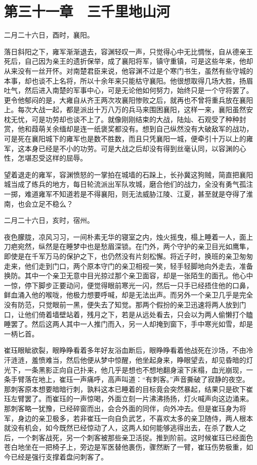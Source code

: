 \chapter{第三十一章　三千里地山河}

二月二十六日，酉时，襄阳。

落日斜阳之下，雍军渐渐退去，容渊轻叹一声，只觉得心中无比惆怅，自从德亲王死后，自己因为亲王的遗折保举，成了襄阳将军，镇守重镇，可是这些年来，他却从来没有一丝开怀。对南楚君臣来说，他容渊不过是个寒门书生，虽然有些守城的本事，却也谈不上名将，所以十余年来只能枯守襄阳。他很想取得几场大胜，扬眉吐气，然后进入南楚的军事中心，可是无论他如何努力，始终只是一个守将罢了。更令他郁闷的是，大雍自从齐王两次攻襄阳惨败之后，就再也不曾将重兵放在襄阳上。每次大战一起，都是派出十万八万的兵马来围困襄阳，这样一来，襄阳虽然安枕无忧，可是功劳却也谈不上了。就像刚刚结束的大战，陆灿、石观受了种种封赏，他和葭萌关余缅却是连一纸褒奖都没有。想到自己纵然没有大破敌军的战功，可是死在襄阳城下的雍军也是数不胜数，而且只凭襄阳一城，便牵引十万以上的雍军，这本身已经是不小的功劳。可是大战之后却没有得到丝毫认同，以容渊的心性，怎堪忍受这样的屈辱。

望着退走的雍军，容渊愤怒的一掌拍在城墙的石跺上，长孙冀这狗贼，简直把襄阳城当成了练兵的地方，每日轮流派出军队攻城，磨合他们的战力，全没有勇气孤注一掷，难道雍军不知道若是不得襄阳，则无法威胁江陵、江夏，甚至就是夺得了淮南，也会立足不稳么？

二月二十六日，亥时，宿州。

夜色朦胧，凉风习习，一间朴素无华的寝室之内，烛火摇曳，榻上睡着一人，面上刀疤宛然，纵然是在睡梦中也是愁眉深锁。在门外，两个守护的亲卫目光如鹰隼，即使是在千军万马的保护之下，也仍然没有片刻松懈。将近子时，换班的亲卫匆匆走来，他们走到门口，两个原本守门的亲卫相视一笑，轻手轻脚地向外走去，准备换防。其中一个亲卫无意中目光掠过那个亲卫面容，却是一张陌生的面孔。他心中一惊，停下脚步正要动问，便觉得眼前寒光一闪，然后一只手已经捂住他的口鼻，鲜血涌入他的喉咙，他极力想要呼喊，却是无法出声。而另外一个亲卫几乎是完全没有防范，只觉眼前一黑，便失去了知觉。那两个假扮的亲卫迅速将两人放到门口，让他们倚着墙壁站着，残月之下，若是从远处看去，只会以为两人偷懒打个瞌睡罢了。然后这两人其中一人推门而入，另一人却掩到窗下，手中寒光如雪，却是一柄匕首。

崔珏眼眦欲裂，眼睁睁看着多年好友浴血断后，眼睁睁看着他战死在沙场，不由冷汗涟涟，羞愤难当，然后他便从梦中惊醒，他坐起身来，睁眼望去，却见昏暗的灯光下，一条黑影正向自己扑来，他几乎是想也不想地翻身滚下床榻，血光崩现，一条手臂落在地上，崔珏一声痛呼，高声叫道：“有刺客。”声音撕破了寂静的夜空。那刺客原本想要暗暗行刺，孰料这本已睡着的目标竟会突然暴起，结果只是砍下崔珏左臂罢了。而崔珏的一声惊喝，外面立刻一片沸沸扬扬，灯火喊声向这边涌来。那刺客略一犹豫，已经碎窗而出，会合外面的同伴，向外冲去。但是崔珏身为将军，身边的亲卫极多，若非崔珏一向自负武艺，不喜欢太多的亲卫随侍，两人根本就没有机会，如今既然已经惊动了人，这两人如何能够逃得出去，在杀了数人之后，一个刺客战死，另一个刺客被那些亲卫活捉。推到阶前。这时候崔珏已经面色苍白地坐在一把椅子上，旁边是军医替他裹伤，骤然断了一臂，崔珏伤势极重，如今已经是强行支撑着盘问刺客了。

